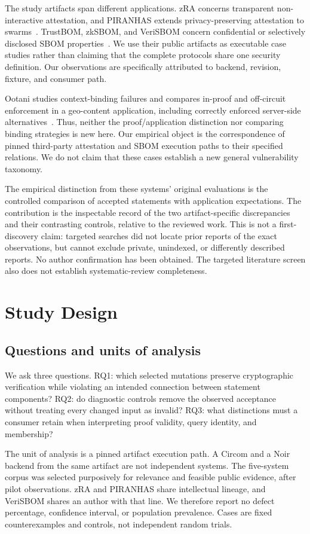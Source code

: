 \documentclass[sigconf,nonacm]{acmart}
\begin{document}
The study artifacts span different applications. zRA concerns transparent non-interactive attestation, and PIRANHAS extends privacy-preserving attestation to swarms~\cite{zra,piranhas}. TrustBOM, zkSBOM, and VeriSBOM concern confidential or selectively disclosed SBOM properties~\cite{trustbom,zksbom,verisbom}. We use their public artifacts as executable case studies rather than claiming that the complete protocols share one security definition. Our observations are specifically attributed to backend, revision, fixture, and consumer path.

Ootani studies context-binding failures and compares in-proof and off-circuit enforcement in a geo-content application, including correctly enforced server-side alternatives~\cite{contextbinding}. Thus, neither the proof/application distinction nor comparing binding strategies is new here. Our empirical object is the correspondence of pinned third-party attestation and SBOM execution paths to their specified relations. We do not claim that these cases establish a new general vulnerability taxonomy.

The empirical distinction from these systems' original evaluations is the controlled comparison of accepted statements with application expectations. The contribution is the inspectable record of the two artifact-specific discrepancies and their contrasting controls, relative to the reviewed work. This is not a first-discovery claim: targeted searches did not locate prior reports of the exact observations, but cannot exclude private, unindexed, or differently described reports. No author confirmation has been obtained. The targeted literature screen also does not establish systematic-review completeness.

\section{Study Design}
\subsection{Questions and units of analysis}
We ask three questions. RQ1: which selected mutations preserve cryptographic verification while violating an intended connection between statement components? RQ2: do diagnostic controls remove the observed acceptance without treating every changed input as invalid? RQ3: what distinctions must a consumer retain when interpreting proof validity, query identity, and membership?

The unit of analysis is a pinned artifact execution path. A Circom and a Noir backend from the same artifact are not independent systems. The five-system corpus was selected purposively for relevance and feasible public evidence, after pilot observations. zRA and PIRANHAS share intellectual lineage, and VeriSBOM shares an author with that line. We therefore report no defect percentage, confidence interval, or population prevalence. Cases are fixed counterexamples and controls, not independent random trials.
\end{document}
